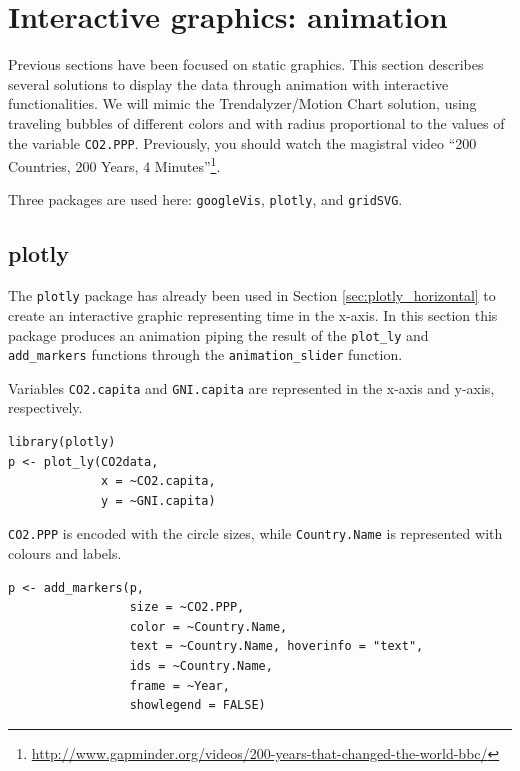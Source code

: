 \section{Interactive graphics: animation \label{sec:timeseries_animation}}
\label{sec:org7a8e07d}

Previous sections have been focused on static graphics. This section
describes several solutions to display the data through animation with
interactive functionalities. We will mimic the Trendalyzer/Motion
Chart solution, using traveling bubbles of different colors and with
radius proportional to the values of the variable
\texttt{CO2.PPP}. Previously, you should watch the magistral video ``200
Countries, 200 Years, 4 Minutes''\footnote{\url{http://www.gapminder.org/videos/200-years-that-changed-the-world-bbc/}}.

Three packages are used here: \texttt{googleVis}, \texttt{plotly}, and \texttt{gridSVG}.


\subsection{plotly \label{sec:plotly_animation}}
\label{sec:org2a9218c}
The \texttt{plotly} package has already been used in Section
\ref{sec:plotly_horizontal} to create an interactive graphic
representing time in the x-axis. In this section this package produces
an animation piping the result of the \texttt{plot\_ly} and \texttt{add\_markers}
functions through the \texttt{animation\_slider} function.


Variables \texttt{CO2.capita} and \texttt{GNI.capita} are represented in the x-axis
and y-axis, respectively.
\lstset{language=r,label= ,caption= ,captionpos=b,numbers=none}
\begin{lstlisting}
library(plotly)
p <- plot_ly(CO2data,
             x = ~CO2.capita,
             y = ~GNI.capita)
\end{lstlisting}

\texttt{CO2.PPP} is encoded with the circle sizes, while \texttt{Country.Name} is
represented with colours and labels.
\lstset{language=r,label= ,caption= ,captionpos=b,numbers=none}
\begin{lstlisting}
p <- add_markers(p,
                 size = ~CO2.PPP,
                 color = ~Country.Name,
                 text = ~Country.Name, hoverinfo = "text",
                 ids = ~Country.Name,
                 frame = ~Year,
                 showlegend = FALSE)
\end{lstlisting}

